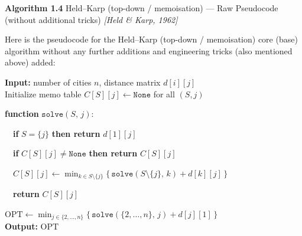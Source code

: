 \documentclass[11pt]{article}
\begin{document}
    \label{pseudo-1-4}

    \begin{pseudobox}

\textbf{Algorithm 1.4} Held--Karp (top-down / memoisation) --- Raw
Pseudocode (without additional tricks) \emph{{[}Held \& Karp, 1962{]}}

\tcbline

Here is the pseudocode for the Held--Karp (top-down / memoisation) core
(base) algorithm without any further additions and engineering tricks
(also mentioned above) added:

\textbf{Input:} number of cities \(n\), distance matrix \(d[i][j]\)\\
Initialize memo table \(C[S][j] \leftarrow \texttt{None}\) for all
\((S, j)\)

\textbf{function} \(\texttt{solve}(S,\, j)\):\\
\strut ~~\textbf{if} \(S = \{j\}\) \textbf{then return} \(d[1][j]\)\\
\strut ~~\textbf{if} \(C[S][j] \neq \texttt{None}\) \textbf{then return}
\(C[S][j]\)\\
\strut ~~\(C[S][j] \leftarrow \displaystyle\min_{k \in S \setminus \{j\}} \bigl\{\, \texttt{solve}(S \setminus \{j\},\, k) + d[k][j] \,\bigr\}\)\\
\strut ~~\textbf{return} \(C[S][j]\)

\(\text{OPT} \leftarrow \displaystyle\min_{j \in \{2, \ldots, n\}} \bigl\{\, \texttt{solve}(\{2, \ldots, n\},\, j) + d[j][1] \,\bigr\}\)\\
\textbf{Output:} \(\text{OPT}\)

\end{pseudobox}
\end{document}

